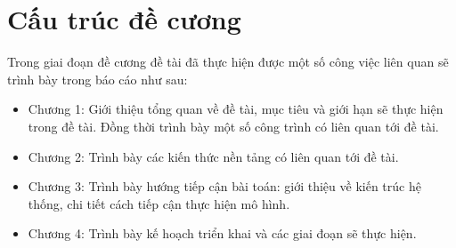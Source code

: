 \section{Cấu trúc đề cương}
Trong giai đoạn đề cương đề tài đã thực hiện được một số công việc liên quan sẽ trình bày trong báo cáo như sau:

\begin{itemize}
\item Chương 1: Giới thiệu tổng quan về đề tài, mục tiêu và giới hạn sẽ thực hiện trong đề tài. Đồng thời trình bày một số công trình có liên quan tới đề tài.
\item Chương 2: Trình bày các kiến thức nền tảng có liên quan tới đề tài.
\item Chương 3: Trình bày hướng tiếp cận bài toán: giới thiệu về kiến trúc hệ thống, chi tiết cách tiếp cận thực hiện mô hình.
\item Chương 4: Trình bày kế hoạch triển khai và các giai đoạn sẽ thực hiện.
\end{itemize}
